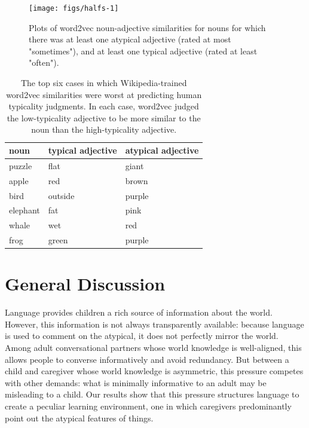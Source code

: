\documentclass[10pt, letterpaper]{article}
\newenvironment{CodeChunk}{}{}
\begin{document}
\begin{CodeChunk}
\begin{figure}[tb]

{\centering \texttt{[image: figs/halfs-1]} 

}

\caption[Plots of word2vec noun-adjective similarities for nouns for which there was at least one atypical adjective (rated at most "sometimes"), and at least one typical adjective (rated at least "often")]{Plots of word2vec noun-adjective similarities for nouns for which there was at least one atypical adjective (rated at most "sometimes"), and at least one typical adjective (rated at least "often").}\label{fig:halfs}
\end{figure}
\end{CodeChunk}

\begin{table}[tb]
\centering
\begin{tabular}{lll}
  \hline
noun & typical adjective & atypical adjective \\ 
  \hline
puzzle & flat & giant \\ 
  apple & red & brown \\ 
  bird & outside & purple \\ 
  elephant & fat & pink \\ 
  whale & wet & red \\ 
  frog & green & purple \\ 
   \hline
\end{tabular}
\caption{The top six cases in which Wikipedia-trained word2vec similarities were worst at predicting human typicality judgments. In each case, word2vec judged the low-typicality adjective to be more similar to the noun than the high-typicality adjective.} 
\label{tab:pairs_tab}
\end{table}

\hypertarget{general-discussion}{%
\section{General Discussion}\label{general-discussion}}

Language provides children a rich source of information about the world.
However, this information is not always transparently available: because
language is used to comment on the atypical, it does not perfectly
mirror the world. Among adult conversational partners whose world
knowledge is well-aligned, this allows people to converse informatively
and avoid redundancy. But between a child and caregiver whose world
knowledge is asymmetric, this pressure competes with other demands: what
is minimally informative to an adult may be misleading to a child. Our
results show that this pressure structures language to create a peculiar
learning environment, one in which caregivers predominantly point out
the atypical features of things.
\end{document}
